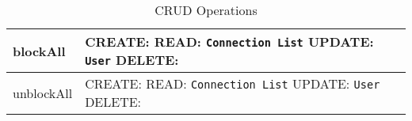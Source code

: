 \begin{table}[H]
	\centering
	\begin{tabular}{|p{5cm}|p{7cm}|}
		\hline
		blockAll &
		CREATE: \newline
		READ: \texttt{Connection List} \newline
		UPDATE: \texttt{User} \newline
		DELETE: \\
		\hline
		unblockAll &
		CREATE: \newline
		READ: \texttt{Connection List} \newline
		UPDATE: \texttt{User} \newline
		DELETE: \\
		\hline
	\end{tabular}
	\caption{CRUD Operations}
	\label{tab:crud_operations}
\end{table}